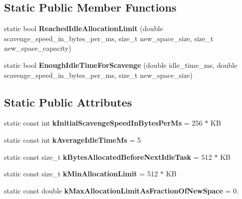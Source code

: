 \subsection*{Static Public Member Functions}
\begin{DoxyCompactItemize}
\item 
static bool {\bfseries Reached\+Idle\+Allocation\+Limit} (double scavenge\+\_\+speed\+\_\+in\+\_\+bytes\+\_\+per\+\_\+ms, size\+\_\+t new\+\_\+space\+\_\+size, size\+\_\+t new\+\_\+space\+\_\+capacity)\hypertarget{classv8_1_1internal_1_1_scavenge_job_abc8b32ff3da05cb65d845027951590ec}{}\label{classv8_1_1internal_1_1_scavenge_job_abc8b32ff3da05cb65d845027951590ec}

\item 
static bool {\bfseries Enough\+Idle\+Time\+For\+Scavenge} (double idle\+\_\+time\+\_\+ms, double scavenge\+\_\+speed\+\_\+in\+\_\+bytes\+\_\+per\+\_\+ms, size\+\_\+t new\+\_\+space\+\_\+size)\hypertarget{classv8_1_1internal_1_1_scavenge_job_a055df953f929bd8b42d52d1ca96958b3}{}\label{classv8_1_1internal_1_1_scavenge_job_a055df953f929bd8b42d52d1ca96958b3}

\end{DoxyCompactItemize}
\subsection*{Static Public Attributes}
\begin{DoxyCompactItemize}
\item 
static const int {\bfseries k\+Initial\+Scavenge\+Speed\+In\+Bytes\+Per\+Ms} = 256 $\ast$ KB\hypertarget{classv8_1_1internal_1_1_scavenge_job_a73be7a33cd4c9e0621139a61a24524a1}{}\label{classv8_1_1internal_1_1_scavenge_job_a73be7a33cd4c9e0621139a61a24524a1}

\item 
static const int {\bfseries k\+Average\+Idle\+Time\+Ms} = 5\hypertarget{classv8_1_1internal_1_1_scavenge_job_a23416920357abe1bedcad9805017ddd1}{}\label{classv8_1_1internal_1_1_scavenge_job_a23416920357abe1bedcad9805017ddd1}

\item 
static const size\+\_\+t {\bfseries k\+Bytes\+Allocated\+Before\+Next\+Idle\+Task} = 512 $\ast$ KB\hypertarget{classv8_1_1internal_1_1_scavenge_job_ae367f695e5a1f6ce8162921108c465e3}{}\label{classv8_1_1internal_1_1_scavenge_job_ae367f695e5a1f6ce8162921108c465e3}

\item 
static const size\+\_\+t {\bfseries k\+Min\+Allocation\+Limit} = 512 $\ast$ KB\hypertarget{classv8_1_1internal_1_1_scavenge_job_a2b8d60098d3eb019b700acb261facbf8}{}\label{classv8_1_1internal_1_1_scavenge_job_a2b8d60098d3eb019b700acb261facbf8}

\item 
static const double {\bfseries k\+Max\+Allocation\+Limit\+As\+Fraction\+Of\+New\+Space} = 0.\hypertarget{classv8_1_1internal_1_1_scavenge_job_aa7e3f75336725f3ecf2aff805fd2c29e}{}\label{classv8_1_1internal_1_1_scavenge_job_aa7e3f75336725f3ecf2aff805fd2c29e}

\end{DoxyCompactItemize}

